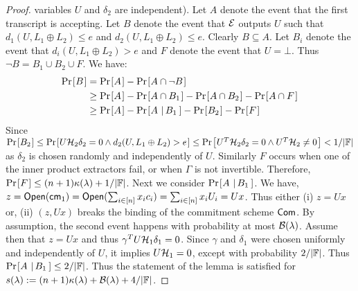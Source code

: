 \begin{proof}
variables $U$ and $\delta_2$ are independent). Let $A$ denote the event that the
first transcript is accepting. Let $B$ denote the event that $\mathcal{E}$ outputs $U$
such that $d_1(U,L_1\oplus L_2)\leq e$ and $d_2(U,L_1\oplus L_2)\leq e$. Clearly
$B\subseteq A$. Let $B_i$ denote the event that $d_i(U,L_1\oplus L_2)>e$ and $F$
denote the event that $U=\bot$. Thus 
$\neg B = B_1\cup B_2\cup F$. We have:
\begin{align}
\prob{B} &= \prob{A} - \prob{A \cap \neg B} \nonumber \\ 
	 &\geq \prob{A} - \prob{A\cap B_1} - \prob{A\cap B_2} -\prob{A\cap F} \\
	 &\geq \prob{A} - \condprob{A}{B_1} - \prob{B_2} - \prob{F}
\end{align}  
Since $\prob{B_2}\leq \prob{U\mc{H}_2\delta_2=0 \wedge d_2(U,L_1\oplus
L_2)>e}\leq \prob{U^T\mc{H}_2\delta_2=0 \wedge U^T\mc{H}_2\neq 0} < 1/|\FF|$ as
$\delta_2$ is chosen randomly and independently of $U$. Similarly $F$ occurs
when one of the inner product extractors fail, or when $\Gamma$ is not
invertible. Therefore, $\prob{F}\leq (n+1)\kappa(\secpar) + 1/|\FF|$.
Next we consider
$\condprob{A}{B_1}$. We have, $z=\mathsf{Open}(\mathsf{cm}_1)=\mathsf{Open}(\sum_{i\in
[n]}x_ic_i)=\sum_{i\in [n]}x_iU_i=Ux$. Thus either (i) $z=Ux$ or, (ii) $(z,Ux)$
breaks the binding of the commitment scheme $\mathsf{Com}$. By assumption, the second
event happens with probability at most $\mathcal{B}(\lambda)$. Assume then that
$z=Ux$ and thus $\gamma^TU\mathcal{H}_1\delta_1=0$. Since $\gamma$ and $\delta_1$
were chosen uniformly and independently of $U$, it implies $U\mathcal{H}_1=0$, except
with probability $2/|\mathbb{F}|$. Thus $\condprob{A}{B_1}\leq 2/|\FF|$. Thus the
statement of the lemma is satisfied for $s(\lambda) := (n+1)\kappa(\lambda) +
\mathcal{B}(\lambda) + 4/|\mathbb{F}|$. 
\end{proof}


